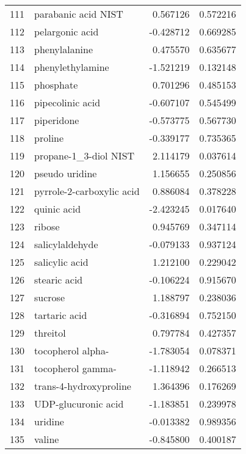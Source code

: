 \begin{tabular}{llrr}
111 &                parabanic acid NIST &  0.567126 &  0.572216 \\
112 &                    pelargonic acid & -0.428712 &  0.669285 \\
113 &                      phenylalanine &  0.475570 &  0.635677 \\
114 &                   phenylethylamine & -1.521219 &  0.132148 \\
115 &                          phosphate &  0.701296 &  0.485153 \\
116 &                   pipecolinic acid & -0.607107 &  0.545499 \\
117 &                         piperidone & -0.573775 &  0.567730 \\
118 &                            proline & -0.339177 &  0.735365 \\
119 &              propane-1\_3-diol NIST &  2.114179 &  0.037614 \\
120 &                     pseudo uridine &  1.156655 &  0.250856 \\
121 &          pyrrole-2-carboxylic acid &  0.886084 &  0.378228 \\
122 &                        quinic acid & -2.423245 &  0.017640 \\
123 &                             ribose &  0.945769 &  0.347114 \\
124 &                    salicylaldehyde & -0.079133 &  0.937124 \\
125 &                     salicylic acid &  1.212100 &  0.229042 \\
126 &                       stearic acid & -0.106224 &  0.915670 \\
127 &                            sucrose &  1.188797 &  0.238036 \\
128 &                      tartaric acid & -0.316894 &  0.752150 \\
129 &                           threitol &  0.797784 &  0.427357 \\
130 &                  tocopherol alpha- & -1.783054 &  0.078371 \\
131 &                  tocopherol gamma- & -1.118942 &  0.266513 \\
132 &             trans-4-hydroxyproline &  1.364396 &  0.176269 \\
133 &                UDP-glucuronic acid & -1.183851 &  0.239978 \\
134 &                            uridine & -0.013382 &  0.989356 \\
135 &                             valine & -0.845800 &  0.400187 \\

\end{tabular}
